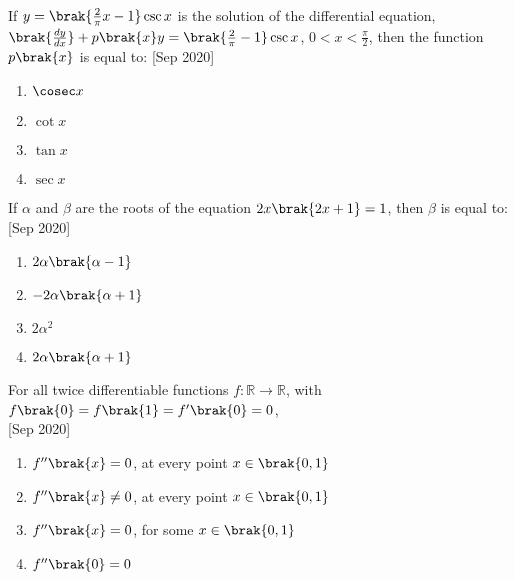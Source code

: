 	\item{
			If $y = \brak{\frac{2}{\pi}x-1} \csc x$ is the solution of the differential equation, $\brak{\frac{dy}{dx}}+p\brak{x}y = \brak{\frac{2}{\pi}-1}\csc x$, $0<x<\frac{\pi}{2}$, then the function $p\brak{x}$ is equal to: 
			\hfill
			{[Sep 2020]}
			
			\begin{multicols}{4}
				\begin{enumerate}
					\item $\cosec x$
					\item $\cot x$
					\item $\tan x$
					\item $\sec x$
				\end{enumerate}
			\end{multicols}
			
		}
 	\item{
			If $\alpha$ and $\beta$ are the roots of the equation $2x\brak{2x+1} = 1$, then $\beta$ is equal to:\\ \text{ }
			\hfill
			{[Sep 2020]}
			
			\begin{multicols}{2}
				\begin{enumerate}
					\item $2\alpha\brak{\alpha-1}$
					\item $-2\alpha\brak{\alpha+1}$
					\item $2\alpha^2$
					\item $2\alpha\brak{\alpha+1}$
				\end{enumerate}
			\end{multicols}
			
		}
    \item{
            For all twice differentiable functions \( f: \mathbb{R} \to \mathbb{R} \), with \( f\brak{0} = f\brak{1} = f^{\prime}\brak{0} = 0 \), \\ \text{ }
             \hfill
                {[Sep 2020]}
            \begin{multicols}{2}
                \begin{enumerate}
                    \item $f^{\prime\prime}\brak{x} = 0$, at every point $x \in \brak{0,1}$
                    \item $f^{\prime\prime}\brak{x} \neq 0$, at every point $x \in \brak{0,1}$
                    \item $f^{\prime\prime}\brak{x} = 0$, for some $x \in \brak{0,1}$
                    \item $f^{\prime\prime}\brak{0} = 0$
                \end{enumerate}
            \end{multicols}

        
        }
